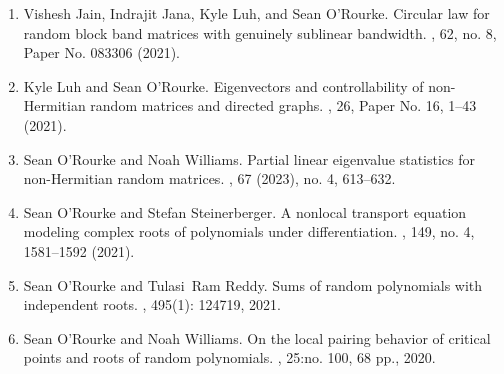 \documentclass[letterpaper]{article}
\begin{document}
\begin{enumerate}
	\item Vishesh Jain, Indrajit Jana, Kyle Luh, and Sean O'Rourke.
	\newblock Circular law for random block band matrices with genuinely sublinear bandwidth.
	, 62, no. 8, Paper No. 083306 (2021). 
	\item Kyle Luh and Sean O'Rourke.
	\newblock Eigenvectors and controllability of non-Hermitian random matrices and directed graphs.
	, 26, Paper No. 16, 1--43 (2021). 
	\item Sean O'Rourke and Noah Williams.
	\newblock Partial linear eigenvalue statistics for non-Hermitian random matrices.
	, 67 (2023), no. 4, 613--632. 
	\item Sean O'Rourke and Stefan Steinerberger.
	\newblock A nonlocal transport equation modeling complex roots of polynomials under differentiation.
	, 149, no. 4, 1581--1592 (2021).   
	\item Sean O'Rourke and Tulasi~Ram Reddy.
	\newblock Sums of random polynomials with independent roots.
	, 495(1): 124719, 2021.  
	\item Sean O'Rourke and Noah Williams.
	\newblock On the local pairing behavior of critical points and roots of random polynomials.
	, 25:no. 100, 68 pp., 2020.  

\end{enumerate}
\end{document}
